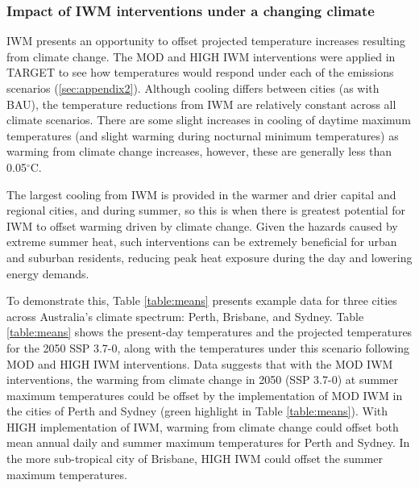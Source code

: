 \documentclass[final,3p,times,authoryear]{elsarticle}
\begin{document}
\subsubsection{Impact of IWM interventions under a changing climate}\label{sec:results3b}

IWM presents an opportunity to offset projected temperature increases resulting from climate change. The MOD and HIGH IWM interventions were applied in TARGET to see how temperatures would respond under each of the emissions scenarios (\ref{sec:appendix2}). Although cooling differs between cities (as with BAU), the temperature reductions from IWM are relatively constant across all climate scenarios. There are some slight increases in cooling of daytime maximum temperatures (and slight warming during nocturnal minimum temperatures) as warming from climate change increases, however, these are generally less than 0.05$^{\circ}$C.

The largest cooling from IWM is provided in the warmer and drier capital and regional cities, and during summer, so this is when there is greatest potential for IWM to offset warming driven by climate change. Given the hazards caused by extreme summer heat, such interventions can be extremely beneficial for urban and suburban residents, reducing peak heat exposure during the day and lowering energy demands. 

To demonstrate this, Table \ref{table:means} presents example data for three cities across Australia’s climate spectrum: Perth, Brisbane, and Sydney. Table \ref{table:means} shows the present-day temperatures and the projected temperatures for the 2050 SSP 3.7-0, along with the temperatures under this scenario following MOD and HIGH IWM interventions. Data suggests that with the MOD IWM interventions, the warming from climate change in 2050 (SSP 3.7-0) at summer maximum temperatures could be offset by the implementation of MOD IWM in the cities of Perth and Sydney (green highlight in Table \ref{table:means}). With HIGH implementation of IWM, warming from climate change could offset both mean annual daily and summer maximum temperatures for Perth and Sydney. In the more sub-tropical city of Brisbane, HIGH IWM could offset the summer maximum temperatures.
\end{document}
